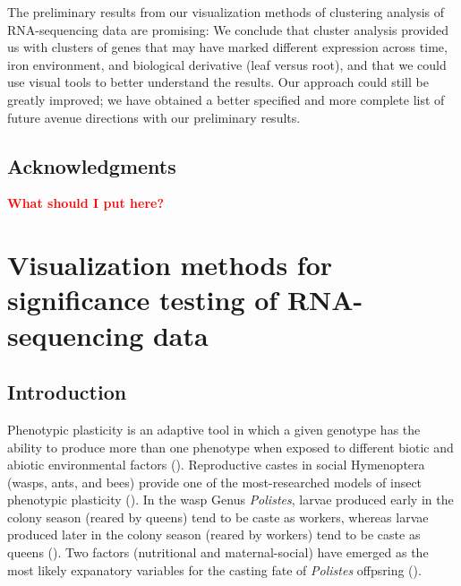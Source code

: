 \documentclass[11pt,a4paper,oldfontcommands,openany]{memoir}
\numberwithin{equation}{section} %
\begin{document}
The preliminary results from our visualization methods of clustering analysis of RNA-sequencing data are promising: We conclude that cluster analysis provided us with clusters of genes that may have marked different expression across time, iron environment, and biological derivative (leaf versus root), and that we could use visual tools to better understand the results. Our approach could still be greatly improved; we have obtained a better specified and more complete list of future avenue directions with our preliminary results. 

\section{Acknowledgments}

\textbf{\textcolor{Red}{What should I put here?}}


\chapter{Visualization methods for significance testing of RNA-sequencing data}

\section{Introduction}

Phenotypic plasticity is an adaptive tool in which a given genotype has the ability to produce more than one phenotype when exposed to different biotic and abiotic environmental factors (\citealt{pw4}). Reproductive castes in social Hymenoptera (wasps, ants, and bees) provide one of the most-researched models of insect phenotypic plasticity (\citealt{pw5}). In the wasp Genus \textit{Polistes}, larvae produced early in the colony season (reared by queens) tend to be caste as workers, whereas larvae produced later in the colony season (reared by workers) tend to be caste as queens (\citealt{pw3}). Two factors (nutritional and maternal-social) have emerged as the most likely expanatory variables for the casting fate of \textit{Polistes} offpsring (\citealt{pw3}).
\end{document}
